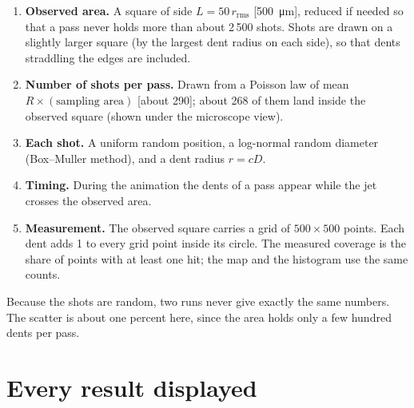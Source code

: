 \documentclass[11pt,a4paper]{article}
\begin{document}
\begin{enumerate}[leftmargin=*]
\item \textbf{Observed area.} A square of side $L=50\,r_{\text{rms}}$ [\SI{500}{\micro m}], reduced if needed so that a pass never holds more than about 2\,500 shots. Shots are drawn on a slightly larger square (by the largest dent radius on each side), so that dents straddling the edges are included.
\item \textbf{Number of shots per pass.} Drawn from a Poisson law of mean $R\times(\text{sampling area})$ [about 290]; about 268 of them land inside the observed square (shown under the microscope view).
\item \textbf{Each shot.} A uniform random position, a log-normal random diameter (Box--Muller method), and a dent radius $r=cD$.
\item \textbf{Timing.} During the animation the dents of a pass appear while the jet crosses the observed area.
\item \textbf{Measurement.} The observed square carries a grid of $500\times500$ points. Each dent adds 1 to every grid point inside its circle. The measured coverage is the share of points with at least one hit; the map and the histogram use the same counts.
\end{enumerate}
Because the shots are random, two runs never give exactly the same numbers. The scatter is about one percent here, since the area holds only a few hundred dents per pass.

\section{Every result displayed}\label{sec:reads}
\end{document}
